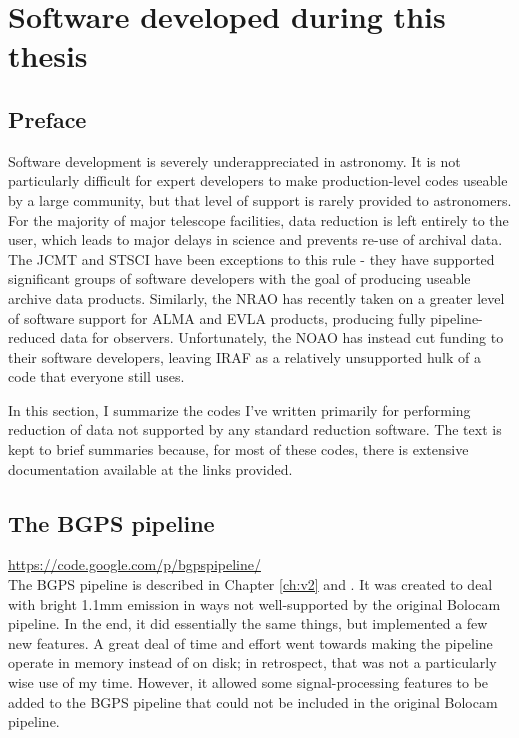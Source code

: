 
\chapter{Software developed during this thesis}
\section{Preface}
Software development is severely underappreciated in astronomy.  It is not
particularly difficult for expert developers to make production-level codes
useable by a large community, but that level of support is rarely provided to
astronomers.  For the majority of major telescope facilities, data reduction is
left entirely to the user, which leads to major delays in science and prevents
re-use of archival data.  The JCMT and STSCI have been exceptions to this rule
- they have supported significant groups of software developers with the goal
of producing useable archive data products.  Similarly, the NRAO has recently
taken on a greater level of software support for ALMA and EVLA products,
producing fully pipeline-reduced data for observers.  Unfortunately, the NOAO
has instead cut funding to their software developers, leaving IRAF as a
relatively unsupported hulk of a code that everyone still uses. 

In this section, I summarize the codes I've written primarily for performing
reduction of data not supported by any standard reduction software.  The text
is kept to brief summaries because, for most of these codes, there is extensive
documentation available at the links provided.

\section{The BGPS pipeline}
\label{sec:bgpspipeline}
\url{https://code.google.com/p/bgpspipeline/} \\
The BGPS pipeline is described in Chapter \ref{ch:v2} and \citet{Aguirre2011}.
It was created to deal with bright 1.1mm emission in ways not well-supported 
by the original Bolocam pipeline.  In the end, it did essentially the same
things, but implemented a few new features.  A great deal of time and effort
went towards making the pipeline operate in memory instead of on disk; in
retrospect, that was not a particularly wise use of my time.  However, it
allowed some signal-processing features to be added to the BGPS pipeline that
could not be included in the original Bolocam pipeline.  

